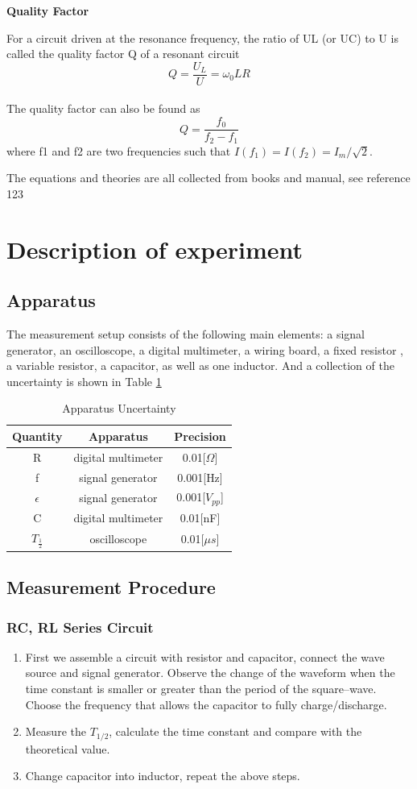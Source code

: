 \documentclass[12pt,a4paper]{article}
\begin{document}
\textbf{Quality Factor}\par
For a circuit driven at the resonance frequency, the ratio of UL (or UC) to
U is called the quality factor Q of a resonant circuit$$Q=\frac{U_L}{U}={\omega_0L}{R}$$ \\

The quality factor can also be found as $$Q=\frac{f_0}{f_2-f_1}$$where f1 and f2 are two frequencies such that $I(f_1) = I(f_2) = I_m/\sqrt{2}$.
\par The equations and theories are all collected from books and manual, see reference 123
\section{Description of experiment}
\subsection{Apparatus}
\qquad The measurement setup consists of the following main elements: a signal generator, an
oscilloscope, a digital multimeter, a wiring board, a fixed resistor , a variable
resistor, a capacitor, as well as one inductor. And a collection of the uncertainty is shown in Table \ref{Apparatus Uncertainty}
\begin{table}[H]
    \centering
    \begin{tabular}{ccc}\hline
    {Quantity} & {Apparatus} & {Precision} \\\hline
    R                 & digital multimeter & 0.01{[}$\Omega ${]}         \\
    f                 & signal generator   & 0.001{[}Hz{]}        \\
    $\epsilon$                 & signal generator   & 0.001{[}$V_{pp}${]}        \\
    C                 & digital multimeter & 0.01{[}nF{]}         \\
     $T_{\frac{1}{2}}$                 & oscilloscope       & 0.01{[}$\mu s${]}        \\\hline
    \end{tabular}
    \caption{Apparatus Uncertainty}
    \label{Apparatus Uncertainty}
\end{table}
\subsection{Measurement Procedure}
\subsubsection{RC, RL Series Circuit}
\begin{enumerate}[1.]
    \item First we assemble a circuit with resistor and capacitor, connect the wave source and signal generator. Observe the change of the waveform when the time constant is smaller or greater than the period of the square–wave. Choose the frequency that allows the capacitor to fully charge/discharge.
    \item Measure the $T_{1/2}$, calculate the time constant and compare with the theoretical value.
    \item Change capacitor into inductor, repeat the above steps.
\end{enumerate}
\end{document}
